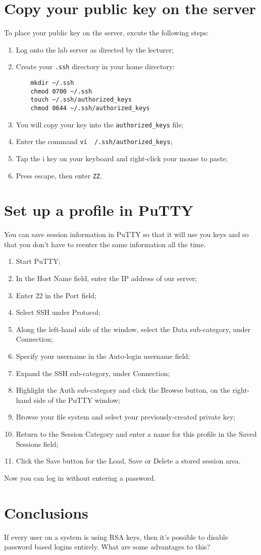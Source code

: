 \documentclass{article}
\begin{document}
\section{Copy your public key on the server}
To place your public key on the server, excute the following steps:

\begin{enumerate}
	\item Log onto the lab server as directed by the lecturer;
	\item Create your \texttt{.ssh} directory in your home directory:
	\begin{verbatim}
	mkdir ~/.ssh
	chmod 0700 ~/.ssh
	touch ~/.ssh/authorized_keys
	chmod 0644 ~/.ssh/authorized_keys
	\end{verbatim}
	\item You will copy your key into the \texttt{authorized\_keys} file;
	\item Enter the command \texttt{vi ~/.ssh/authorized\_keys};
	\item Tap the i key on your keyboard and right-click your mouse to paste;
	\item Press escape, then enter \texttt{ZZ}.
\end{enumerate}

\section{Set up a profile in PuTTY}
You can save session information in PuTTY so that it will use you keys and so that you don't have to reenter the same information all the time.

\begin{enumerate}
	\item Start PuTTY;
	\item In the Host Name field, enter the IP address of our server; 
	\item Enter 22 in the Port field;
	\item Select SSH under Protocol;
	\item Along the left-hand side of the window, select the Data sub-category, under Connection;
	\item Specify your username in the Auto-login username field;
	\item Expand the SSH sub-category, under Connection;
	\item Highlight the Auth sub-category and click the Browse button, on the right-hand side of the PuTTY window;
	\item Browse your file system and select your previously-created private key;
	\item Return to the Session Category and enter a name for this profile in the Saved Sessions field;
	\item Click the Save button for the Load, Save or Delete a stored session area.
\end{enumerate}

Now you can log in without entering a password.

\section{Conclusions}
If every user on a system is using RSA keys, then it's possible to disable password based logins entirely.  What are some advantages to this?
\end{document}
